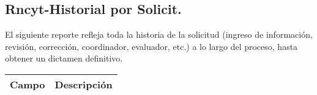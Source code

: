 \newpage
\subsection{Rncyt-Historial por Solicit.}
\label{appendix:Reportes:PeopleSoft:RncytHistorialSolicitud}

El siguiente reporte refleja toda la historia de la solicitud (ingreso de información, revisión, corrección, coordinador, evaluador, etc.) a lo largo del proceso, hasta obtener un dictamen definitivo.\\

\begin{tabular}{ m{} m{}  }%
	\rowcolor{gray1} {\bf Campo} &  {\bf Descripción} \\ \hline \hline


\end{tabular}
